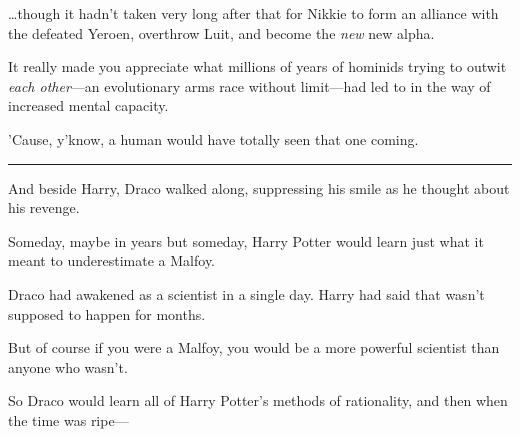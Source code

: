 \ldots{}though it hadn't taken very long after that for Nikkie to form
an alliance with the defeated Yeroen, overthrow Luit, and become the
\emph{new} new alpha.

It really made you appreciate what millions of years of hominids trying
to outwit \emph{each other}---an evolutionary arms race without
limit---had led to in the way of increased mental capacity.

'Cause, y'know, a human would have totally seen that one coming.

\begin{center}\rule{3in}{0.4pt}\end{center}

And beside Harry, Draco walked along, suppressing his smile as he
thought about his revenge.

Someday, maybe in years but someday, Harry Potter would learn just what
it meant to underestimate a Malfoy.

Draco had awakened as a scientist in a single day. Harry had said that
wasn't supposed to happen for months.

But of course if you were a Malfoy, you would be a more powerful
scientist than anyone who wasn't.

So Draco would learn all of Harry Potter's methods of rationality, and
then when the time was ripe---
